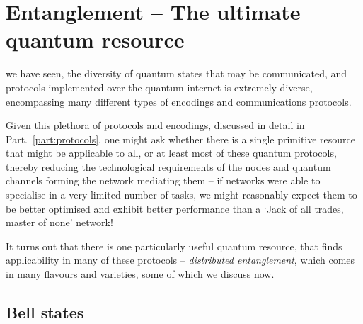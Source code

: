 %
%

\section{Entanglement -- The ultimate quantum resource} \label{sec:ent_ultimate} 

 we have seen, the diversity of quantum states that may be communicated, and protocols implemented over the quantum internet is extremely diverse, encompassing many different types of encodings and communications protocols.

Given this plethora of protocols and encodings, discussed in detail in Part.~\ref{part:protocols}, one might ask whether there is a single primitive resource that might be applicable to all, or at least most of these quantum protocols, thereby reducing the technological requirements of the nodes and quantum channels forming the network mediating them -- if networks were able to specialise in a very limited number of tasks, we might reasonably expect them to be better optimised and exhibit better performance than a `Jack of all trades, master of none' network!

It turns out that there is one particularly useful quantum resource, that finds applicability in many of these protocols -- \textit{distributed entanglement}, which comes in many flavours and varieties, some of which we discuss now.

%
%

\subsection{Bell states}

